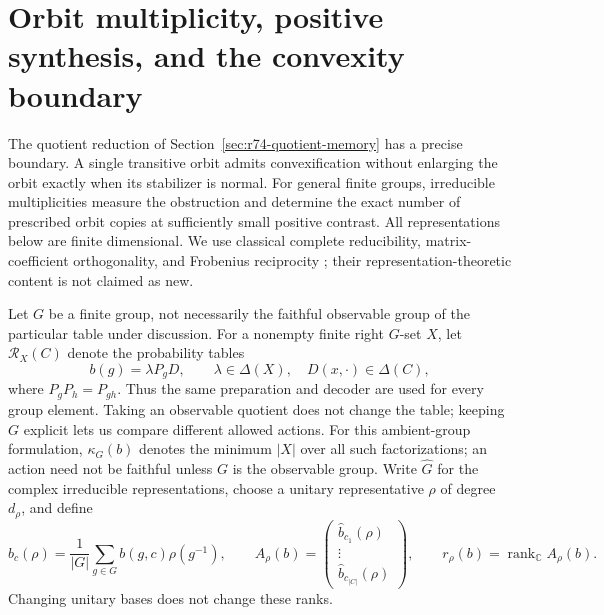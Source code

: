 \section{Orbit multiplicity, positive synthesis, and the convexity boundary}
\label{sec:r75-orbit-multiplicity}

The quotient reduction of Section~\ref{sec:r74-quotient-memory} has a precise
boundary. A single transitive orbit admits convexification without enlarging
the orbit exactly when its stabilizer is normal. For general finite groups,
irreducible multiplicities measure the obstruction and determine the exact
number of prescribed orbit copies at sufficiently small positive contrast.
All representations below are finite dimensional. We use classical complete
reducibility, matrix-coefficient orthogonality, and Frobenius reciprocity
\cite{Serre77}; their representation-theoretic content is not claimed as new.

Let $G$ be a finite group, not necessarily the faithful observable group of
the particular table under discussion. For a nonempty finite right $G$-set
$X$, let $\mathcal R_X(C)$ denote the probability tables
\[
 b(g)=\lambda P_gD,\qquad
 \lambda\in\Delta(X),\quad D(x,\cdot)\in\Delta(C),
\]
where $P_gP_h=P_{gh}$. Thus the same preparation and decoder are used for
every group element. Taking an observable quotient does not change the
table; keeping $G$ explicit lets us compare different allowed actions.
For this ambient-group formulation, $\kappa_G(b)$ denotes the minimum
$|X|$ over all such factorizations; an action need not be faithful unless
$G$ is the observable group.
Write $\widehat G$ for the complex irreducible representations, choose a
unitary representative $\rho$ of degree $d_\rho$, and define
\begin{equation}\label{eq:r75-fourier-block}
 \widehat b_c(\rho)=\frac1{|G|}\sum_{g\in G}b(g,c)\rho(g^{-1}),
 \qquad
 A_\rho(b)=\begin{pmatrix}
 \widehat b_{c_1}(\rho)\\ \vdots\\ \widehat b_{c_{|C|}}(\rho)
 \end{pmatrix},
 \qquad r_\rho(b)=\operatorname{rank}_{\mathbb C}A_\rho(b).
\end{equation}
Changing unitary bases does not change these ranks.

